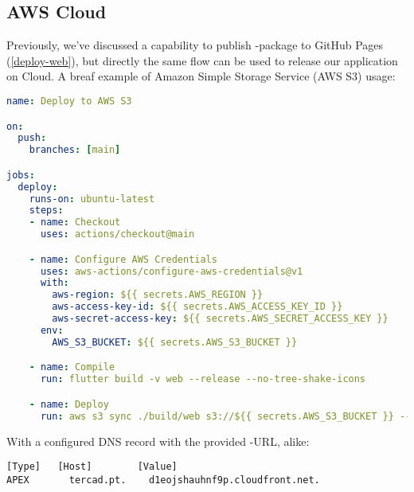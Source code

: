 
\newpage
\subsection{AWS Cloud}

Previously, we've discussed a capability to publish -package to GitHub Pages (\ref{deploy-web}), but 
directly the same flow can be used to release our application on Cloud. A breaf example of Amazon Simple Storage 
Service (AWS S3) usage:

\begin{lstlisting}[language=yaml]
name: Deploy to AWS S3

on: 
  push:
    branches: [main]

jobs:
  deploy:
    runs-on: ubuntu-latest
    steps:
    - name: Checkout
      uses: actions/checkout@main

    - name: Configure AWS Credentials
      uses: aws-actions/configure-aws-credentials@v1
      with:
        aws-region: ${{ secrets.AWS_REGION }}
        aws-access-key-id: ${{ secrets.AWS_ACCESS_KEY_ID }}
        aws-secret-access-key: ${{ secrets.AWS_SECRET_ACCESS_KEY }}
      env:
        AWS_S3_BUCKET: ${{ secrets.AWS_S3_BUCKET }}

    - name: Compile
      run: flutter build -v web --release --no-tree-shake-icons

    - name: Deploy
      run: aws s3 sync ./build/web s3://${{ secrets.AWS_S3_BUCKET }} --delete
\end{lstlisting}

\noindent With a configured DNS record with the provided -URL, alike:

\begin{lstlisting}[language=terminal]
[Type]	 [Host]        [Value]
APEX	   tercad.pt.    d1eojshauhnf9p.cloudfront.net.
\end{lstlisting}
